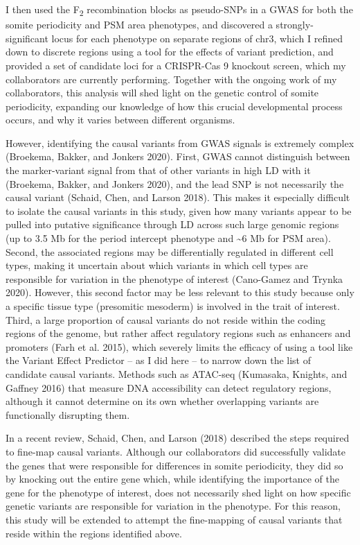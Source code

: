 \documentclass[
]{book}
\begin{document}
I then used the F\textsubscript{2} recombination blocks as pseudo-SNPs in a GWAS for both the somite periodicity and PSM area phenotypes, and discovered a strongly-significant locus for each phenotype on separate regions of chr3, which I refined down to discrete regions using a tool for the effects of variant prediction, and provided a set of candidate loci for a CRISPR-Cas 9 knockout screen, which my collaborators are currently performing. Together with the ongoing work of my collaborators, this analysis will shed light on the genetic control of somite periodicity, expanding our knowledge of how this crucial developmental process occurs, and why it varies between different organisms.

However, identifying the causal variants from GWAS signals is extremely complex (Broekema, Bakker, and Jonkers 2020). First, GWAS cannot distinguish between the marker-variant signal from that of other variants in high LD with it (Broekema, Bakker, and Jonkers 2020), and the lead SNP is not necessarily the causal variant (Schaid, Chen, and Larson 2018). This makes it especially difficult to isolate the causal variants in this study, given how many variants appear to be pulled into putative significance through LD across such large genomic regions (up to 3.5 Mb for the period intercept phenotype and \textasciitilde6 Mb for PSM area). Second, the associated regions may be differentially regulated in different cell types, making it uncertain about which variants in which cell types are responsible for variation in the phenotype of interest (Cano-Gamez and Trynka 2020). However, this second factor may be less relevant to this study because only a specific tissue type (presomitic mesoderm) is involved in the trait of interest. Third, a large proportion of causal variants do not reside within the coding regions of the genome, but rather affect regulatory regions such as enhancers and promoters (Farh et al. 2015), which severely limits the efficacy of using a tool like the Variant Effect Predictor -- as I did here -- to narrow down the list of candidate causal variants. Methods such as ATAC-seq (Kumasaka, Knights, and Gaffney 2016) that measure DNA accessibility can detect regulatory regions, although it cannot determine on its own whether overlapping variants are functionally disrupting them.

In a recent review, Schaid, Chen, and Larson (2018) described the steps required to fine-map causal variants. Although our collaborators did successfully validate the genes that were responsible for differences in somite periodicity, they did so by knocking out the entire gene which, while identifying the importance of the gene for the phenotype of interest, does not necessarily shed light on how specific genetic variants are responsible for variation in the phenotype. For this reason, this study will be extended to attempt the fine-mapping of causal variants that reside within the regions identified above.
\end{document}
